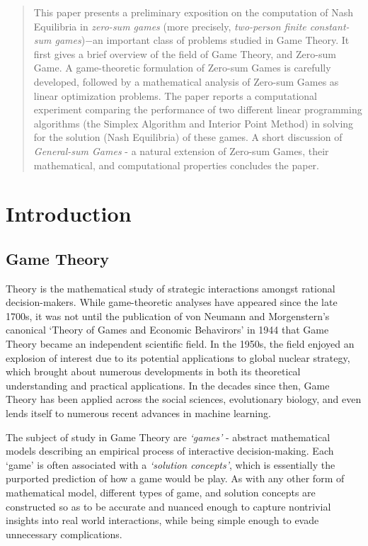 \documentclass[11pt,reqno, a4]{amsart}
\begin{document}
\begin{abstract}
    This paper presents a preliminary exposition on the computation of Nash Equilibria in \textit{zero-sum games} (more precisely, \textit{two-person finite constant-sum games})\(-\)an important class of problems studied in Game Theory. It first gives a brief overview of the field of Game Theory, and Zero-sum Game. A game-theoretic formulation of Zero-sum Games is carefully developed, followed by a mathematical analysis of Zero-sum Games as linear optimization problems. The paper reports a computational experiment comparing the performance of two different linear programming algorithms (the Simplex Algorithm and Interior Point Method) in solving for the solution (Nash Equilibria) of these games. A short discussion of \textit{General-sum Games} - a natural extension of Zero-sum Games, their mathematical, and computational properties concludes the paper.
\end{abstract}
\section{Introduction}
\subsection{Game Theory}
 Theory is the mathematical study of strategic interactions amongst rational decision-makers. While game-theoretic analyses have appeared since the late 1700s, it was not until the publication of von Neumann and Morgenstern’s canonical ‘Theory of Games and Economic Behavirors’ in 1944 that Game Theory became an independent scientific field. In the 1950s, the field enjoyed an explosion of interest due to its potential applications to global nuclear strategy, which brought about numerous developments in both its theoretical understanding and practical applications. In the decades since then, Game Theory has been applied across the social sciences, evolutionary biology, and even lends itself to numerous recent advances in machine learning. 

The subject of study in Game Theory are \textit{`games'} - abstract mathematical models describing an empirical process of interactive decision-making. Each `game' is often associated with a \textit{`solution concepts'}, which is essentially the purported prediction of how a game would be play. As with any other form of mathematical model, different types of game, and solution concepts are constructed so as to be accurate and nuanced enough to capture nontrivial insights into real world interactions, while being simple enough to evade unnecessary complications.
\end{document}
